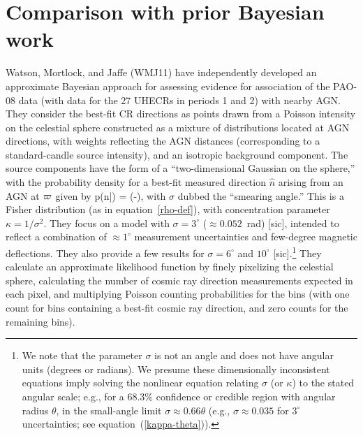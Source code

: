 \section{Comparison with prior Bayesian work}
\label{app:WMJ11}

Watson, Mortlock, and Jaffe \cite{WMJ11-BayesUHECR} (WMJ11) have
independently developed an approximate Bayesian approach for assessing
evidence for association of the PAO-08 data (with data for the 27 UHECRs in
periods 1 and 2) with nearby AGN.  They consider the best-fit CR directions
as points drawn from a Poisson intensity on the celestial sphere constructed
as a mixture of distributions located at AGN directions, with weights
reflecting the AGN distances (corresponding to a standard-candle
source intensity), and an isotropic background component.  The source
components have the form of a ``two-dimensional Gaussian on the sphere,''
with the probability density for a best-fit measured direction $\hat n$
arising from an AGN at $\varpi$ given by
\be
p(\hat n|\hdrxn)
  = 
    \exp\left(-\right),
\label{sphere-gauss}
\ee
with $\sigma$ dubbed the ``smearing angle.'' This is a Fisher distribution
(as in equation~\ref{rho-def}), with concentration parameter $\kappa =
1/\sigma^2$.  They focus on a model with  $\sigma = 3^\circ$ ($\approx
0.052$~rad) [sic], intended to reflect a combination of $\approx 1^\circ$
measurement uncertainties and few-degree magnetic deflections.  They also
provide a few results for $\sigma = 6^\circ$ and $10^\circ$ [sic].\footnote{We
note that the parameter $\sigma$ is not an angle and does not have angular
units (degrees or radians).  We presume these dimensionally inconsistent
equations imply solving the nonlinear equation relating $\sigma$ (or $\kappa$)
to the stated angular scale; e.g., for a 68.3\% confidence or credible region
with angular radius $\theta$, in the small-angle limit $\sigma \approx
0.66\theta$ (e.g., $\sigma \approx 0.035$ for $3^\circ$ uncertainties;
see equation~(\ref{kappa-theta})).}
They calculate an approximate likelihood function by finely pixelizing the
celestial sphere, calculating the number of cosmic ray direction
measurements expected in each pixel, and multiplying Poisson counting
probabilities for the bins (with one count for bins containing a best-fit
cosmic ray direction, and zero counts for the remaining bins).

